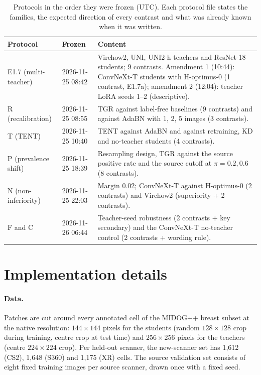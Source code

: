 \begin{table}[htbp]
{\caption{Protocols in the order they were frozen (UTC). Each protocol file states the families, the expected direction
of every contrast and what was already known when it was written.}}
{%
\scriptsize
\setlength{\tabcolsep}{4pt}
\begin{tabular}{@{}llp{7.2cm}@{}}
\toprule
Protocol & Frozen & Content \\
\midrule
E1.7 (multi-teacher) & 2026-11-25 08:42 & Virchow2, UNI, UNI2-h teachers and ResNet-18 students; 9 contrasts. Amendment 1 (10:44): ConvNeXt-T students with H-optimus-0 (1 contrast, E1.7a); amendment 2 (12:04): teacher LoRA seeds 1--2 (descriptive). \\
R (recalibration) & 2026-11-25 08:55 & TGR against label-free baselines (9 contrasts) and against AdaBN with 1, 2, 5 images (3 contrasts). \\
T (TENT) & 2026-11-25 10:40 & TENT against AdaBN and against retraining, KD and no-teacher students (4 contrasts). \\
P (prevalence shift) & 2026-11-25 18:39 & Resampling design, TGR against the source positive rate and the source cutoff at $\pi=0.2, 0.6$ (8 contrasts). \\
N (non-inferiority) & 2026-11-25 22:03 & Margin 0.02; ConvNeXt-T against H-optimus-0 (2 contrasts) and Virchow2 (superiority + 2 contrasts). \\
F and C & 2026-11-26 06:44 & Teacher-seed robustness (2 contrasts + key secondary) and the ConvNeXt-T no-teacher control (2 contrasts + wording rule). \\
\bottomrule
\end{tabular}
}
\end{table}



\FloatBarrier
\section{Implementation details}
\label{app:impl}



\paragraph{Data.} Patches are cut around every annotated cell of the MIDOG++ breast subset at the native resolution:
$144\times144$ pixels for the students (random $128\times128$ crop during training, centre crop at test time) and
$256\times256$ pixels for the teachers (centre $224\times224$ crop). Per held-out scanner, the new-scanner set has 1{,}612
(CS2), 1{,}648 (S360) and 1{,}175 (XR) cells. The source validation set consists of eight fixed training images per
source scanner, drawn once with a fixed seed.

